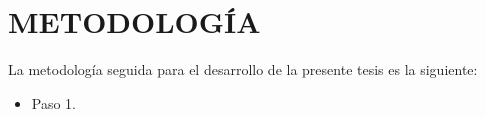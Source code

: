 \section{METODOLOGÍA}

La metodología seguida para el desarrollo de la presente tesis es la siguiente:

\begin{itemize}
    \item Paso 1.
\end{itemize}
